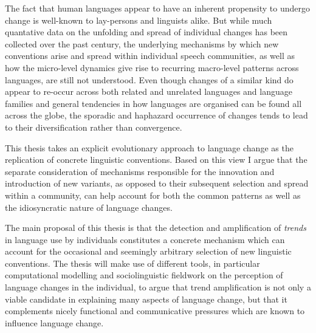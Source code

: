 


The fact that human languages appear to have an inherent propensity to undergo change is well-known to lay-persons and linguists alike.
But while much quantative data on the unfolding and spread of individual changes has been collected over the past century, the underlying mechanisms by which new conventions arise and spread within individual speech communities, as well as how the micro-level dynamics give rise to recurring macro-level patterns across languages, are still not understood.
Even though changes of a similar kind do appear to re-occur across both related and unrelated languages and language families and general tendencies in how languages are organised can be found all across the globe, the sporadic and haphazard occurrence of changes tends to lead to their diversification rather than convergence.

This thesis takes an explicit evolutionary approach to language change as the replication of concrete linguistic conventions. Based on this view I argue that the separate consideration of mechanisms responsible for the innovation and introduction of new variants, as opposed to their subsequent selection and spread within a community, can help account for both the common patterns as well as the idiosyncratic nature of language changes.

The main proposal of this thesis is that the detection and amplification of \emph{trends} in language use by individuals constitutes a concrete mechanism which can account for the occasional and seemingly arbitrary selection of new linguistic conventions.
The thesis will make use of different tools, in particular computational modelling and sociolinguistic fieldwork on the perception of language changes in the individual, to argue that trend amplification is not only a viable candidate in explaining many aspects of language change, but that it complements nicely functional and communicative pressures which are known to influence language change.


